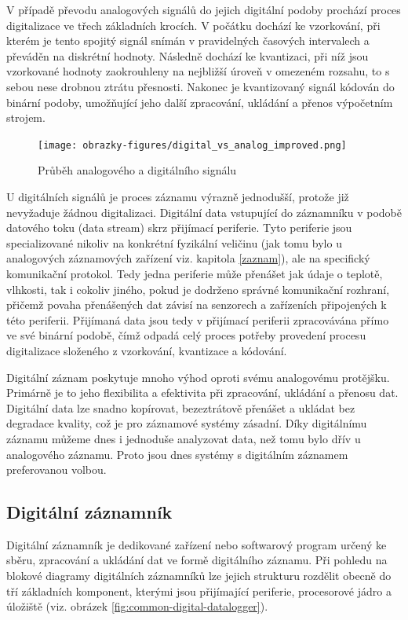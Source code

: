 V případě převodu analogových signálů do jejich digitální podoby prochází proces digitalizace ve třech základních krocích. V počátku dochází ke vzorkování, při kterém je tento spojitý signál snímán v pravidelných časových intervalech a převáděn na diskrétní hodnoty. Následně dochází ke kvantizaci, při níž jsou vzorkované hodnoty zaokrouhleny na nejbližší úroveň v omezeném rozsahu, to s sebou nese drobnou ztrátu přesnosti. Nakonec je kvantizovaný signál kódován do binární podoby, umožňující jeho další zpracování, ukládání a přenos výpočetním strojem.

\begin{figure}[h]
    \centering
    \texttt{[image: obrazky-figures/digital\_vs\_analog\_improved.png]}
    \caption{Průběh analogového a digitálního signálu}
    \label{fig:digital-vs-analog}
\end{figure}

U digitálních signálů je proces záznamu výrazně jednodušší, protože již nevyžaduje žádnou digitalizaci. Digitální data vstupující do záznamníku v podobě datového toku (data stream) skrz přijímací periferie. Tyto periferie jsou specializované nikoliv na konkrétní fyzikální veličinu (jak tomu bylo u analogových záznamových zařízení viz. kapitola \ref{zaznam}), ale na specifický komunikační protokol. Tedy jedna periferie může přenášet jak údaje o teplotě, vlhkosti, tak i cokoliv jiného, pokud je dodrženo správné komunikační rozhraní, přičemž povaha přenášených dat závisí na senzorech a zařízeních připojených k této periferii. Přijímaná data jsou tedy v přijímací periferii zpracovávána přímo ve své binární podobě, čímž odpadá celý proces potřeby provedení procesu digitalizace složeného z vzorkování, kvantizace a kódování. 

\newpage

Digitální záznam poskytuje mnoho výhod oproti svému analogovému protějšku. Primárně je to jeho flexibilita a efektivita při zpracování, ukládání a přenosu dat. Digitální data lze snadno kopírovat, bezeztrátově přenášet a ukládat bez degradace kvality, což je pro záznamové systémy zásadní. Díky digitálnímu záznamu můžeme dnes i jednoduše analyzovat data, než tomu bylo dřív u analogového záznamu. Proto jsou dnes systémy s digitálním záznamem preferovanou volbou.

    
\subsection{Digitální záznamník}
\label{digitalni_zaznamik}
Digitální záznamník je dedikované zařízení nebo softwarový program určený ke sběru, zpracování a ukládání dat ve formě digitálního záznamu. Při pohledu na blokové diagramy digitálních záznamníků lze jejich strukturu rozdělit obecně do tří základních komponent, kterými jsou přijímající periferie, procesorové jádro a úložiště (viz. obrázek \ref{fig:common-digital-datalogger}). \cite{researchgate_general_dataloggger_multiple_sdcards, ieee_digital_sound_recorder_arm_sd_card, ieee_multi_connectivity_datalogger_sd_card}

